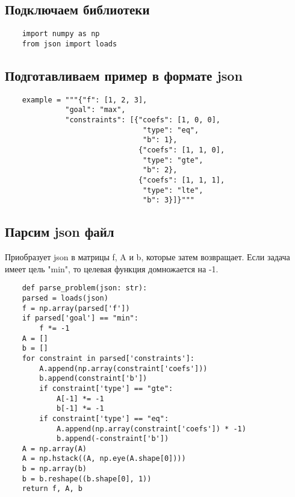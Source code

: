 \documentclass{article}
\begin{document}
\subsection{Подключаем библиотеки}

\begin{listing}[H]
    \begin{verbatim}
    import numpy as np
    from json import loads
    \end{verbatim}
\end{listing}

\subsection{Подготавливаем пример в формате json}
\begin{listing}[H]
    \begin{verbatim}
    example = """{"f": [1, 2, 3],
              "goal": "max",
              "constraints": [{"coefs": [1, 0, 0],
                                "type": "eq",
                                "b": 1},
                               {"coefs": [1, 1, 0],
                                "type": "gte",
                                "b": 2},
                               {"coefs": [1, 1, 1],
                                "type": "lte",
                                "b": 3}]}"""
    \end{verbatim}
\end{listing}

\subsection{Парсим json файл}

Приобразует json в матрицы f, A и b, которые затем возвращает. Если задача имеет цель "min", то целевая функция домножается на -1.

\begin{listing}[H]
    \begin{verbatim}
    def parse_problem(json: str):
    parsed = loads(json)
    f = np.array(parsed['f'])
    if parsed['goal'] == "min":
        f *= -1
    A = []
    b = []
    for constraint in parsed['constraints']:
        A.append(np.array(constraint['coefs']))
        b.append(constraint['b'])
        if constraint['type'] == "gte":
            A[-1] *= -1
            b[-1] *= -1
        if constraint['type'] == "eq":
            A.append(np.array(constraint['coefs']) * -1)
            b.append(-constraint['b'])
    A = np.array(A)
    A = np.hstack((A, np.eye(A.shape[0])))
    b = np.array(b)
    b = b.reshape((b.shape[0], 1))
    return f, A, b
    \end{verbatim}
\end{listing}
\end{document}
